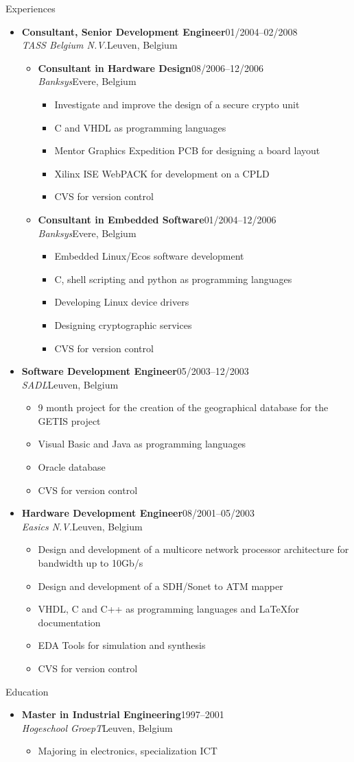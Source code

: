 \documentclass[12pt,oneside]{article}
\newenvironment{ressection}[1]{
	\vspace{5pt}
	{\selectfont\Large#1}
	\begin{itemize}
	\vspace{5pt}
}{
	\end{itemize}
}
\newcommand{\ressubitem}[1]{
	\vspace{-4pt}
	\item \begin{flushleft} #1 \end{flushleft}
}
\newcommand{\resbigitem}[4]{
	\vspace{-5pt}
	\item
	\textbf{#1}\hfill#4 \\
	\textit{#2}\hfill#3
}
\newenvironment{ressubsec}[4]{
	\resbigitem{#1}{#2}{#3}{#4}
	\vspace{-2pt}
	\begin{itemize}
}{
	\end{itemize}
}
\newenvironment{ressubsubsec}[4]{
	\vspace{5pt}
	\resbigitem{#1}{#2}{#3}{#4}
	\begin{itemize}
}{
	\end{itemize}
}
\newcommand{\ressubsubitem}[1]{
	\vspace{-1pt}
	\item \begin{flushleft} #1 \end{flushleft}
}
\begin{document}
\begin{ressection}{Experiences}
\begin{ressubsec}{Consultant, Senior Development Engineer}{TASS Belgium N.V.}{Leuven, Belgium}{01/2004--02/2008}
\begin{ressubsubsec}{Consultant in Hardware Design}{Banksys}{Evere, Belgium}{08/2006--12/2006}
			\ressubsubitem{Investigate and improve the design of a secure crypto unit}
			\ressubsubitem{C and VHDL as programming languages}
			\ressubsubitem{Mentor Graphics Expedition PCB for designing a board layout}
			\ressubsubitem{Xilinx ISE WebPACK for development on a CPLD}
			\ressubsubitem{CVS for version control}
		\end{ressubsubsec}
		\begin{ressubsubsec}{Consultant in Embedded Software}{Banksys}{Evere, Belgium}{01/2004--12/2006}
			\ressubsubitem{Embedded Linux/Ecos software development}
			\ressubsubitem{C, shell scripting and python as programming languages}
			\ressubsubitem{Developing Linux device drivers}
			\ressubsubitem{Designing cryptographic services}
			\ressubsubitem{CVS for version control}
		\end{ressubsubsec}
	\end{ressubsec}
	\begin{ressubsec}{Software Development Engineer}{SADL}{Leuven, Belgium}{05/2003--12/2003}
		\ressubitem{9 month project for the creation of the geographical database for the GETIS project}
		\ressubitem{Visual Basic and Java as programming languages}
		\ressubitem{Oracle database}
		\ressubitem{CVS for version control}
	\end{ressubsec}
	\begin{ressubsec}{Hardware Development Engineer}{Easics N.V.}{Leuven, Belgium}{08/2001--05/2003}
		\ressubitem{Design and development of a multicore network processor architecture for bandwidth up to 10Gb/s}
		\ressubitem{Design and development of a SDH/Sonet to ATM mapper}
		\ressubitem{VHDL, C and C++ as programming languages and \LaTeX for documentation}
		\ressubitem{EDA Tools for simulation and synthesis}
		\ressubitem{CVS for version control}
	\end{ressubsec}
\end{ressection}

\begin{ressection}{Education}
	\begin{ressubsec}{Master in Industrial Engineering}{Hogeschool GroepT}{Leuven, Belgium}{1997--2001}
		\ressubitem{Majoring in electronics, specialization ICT}
	\end{ressubsec}
\end{ressection}
\end{document}
